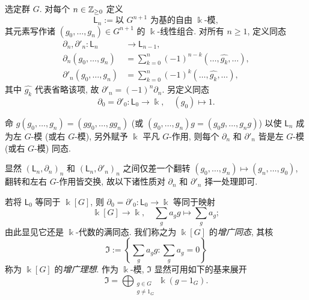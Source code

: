 \begin{definition}\label{def:resolution-trivial-module}
	选定群 $G$. 对每个 $n \in \mathbb{Z}_{\geq 0}$ 定义
	\[ \mathsf{L}_n := \text{以 $G^{n+1}$ 为基的自由 $\Bbbk$-模}, \]
	其元素写作诸 $(g_0, \ldots, g_n) \in G^{n+1}$ 的 $\Bbbk$-线性组合. 对所有 $n \geq 1$, 定义同态
	\begin{align*}
		\partial_n, \partial'_n: \mathsf{L}_n & \to \mathsf{L}_{n-1}, \\
		\partial_n\left( g_0, \ldots, g_n \right) & = \sum_{k=0}^n (-1)^{n-k} (\ldots, \widehat{g_k}, \ldots), \\
		\partial'_n\left( g_0, \ldots, g_n \right) & = \sum_{k=0}^n (-1)^k (\ldots, \widehat{g_k}, \ldots),
	\end{align*}
	其中 $\widehat{g_k}$ 代表省略该项, 故 $\partial'_n = (-1)^n \partial_n$. 另定义同态
	\[ \partial_0 = \partial'_0: \mathsf{L}_0 \to \Bbbk, \quad (g_0) \mapsto 1. \]
	
	命 $g(g_0, \ldots, g_n) = (gg_0, \ldots, gg_n)$ (或 $(g_0, \ldots, g_n)g = (g_0 g, \ldots, g_n g)$) 以使 $\mathsf{L}_n$ 成为左 $G$-模 (或右 $G$-模), 另外赋予 $\Bbbk$ 平凡 $G$-作用, 则每个 $\partial_n$ 和 $\partial'_n$ 皆是左 $G$-模 (或右 $G$-模) 同态.
\end{definition}

显然 $(\mathsf{L}_n, \partial_n)_n$ 和 $(\mathsf{L}_n, \partial'_n)_n$ 之间仅差一个翻转 $(g_0, \ldots, g_n) \mapsto (g_n, \ldots, g_0)$, 翻转和左右 $G$-作用皆交换, 故以下诸性质对 $\partial_n$ 和 $\partial'_n$ 择一处理即可.

\begin{remark}\label{rem:augmentation-kG}
	若将 $\mathsf{L}_0$ 等同于 $\Bbbk[G]$, 则 $\partial_0 = \partial'_0: \mathsf{L}_0 \to \Bbbk$ 等同于映射
	\[ \Bbbk[G] \to \Bbbk, \quad \sum_g a_g g \mapsto \sum_g a_g; \]
	由此显见它还是 $\Bbbk$-代数的满同态. 我们称之为 $\Bbbk[G]$ 的\emph{增广同态}, 其核
	\[ \mathfrak{I} := \left\{ \sum_g a_g g : \sum_g a_g = 0 \right\} \]
	称为 $\Bbbk[G]$ 的\emph{增广理想}. 作为 $\Bbbk$-模, $\mathfrak{I}$ 显然可用如下的基来展开
	\[ \mathfrak{I} = \bigoplus_{\substack{g \in G \\ g \neq 1_G}} \Bbbk (g - 1_G). \]
\end{remark}

